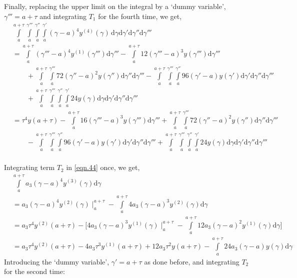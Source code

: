 \documentclass{article}
\begin{document}
Finally, replacing the upper limit on the integral by a \lq dummy variable\rq, $\gamma'''=a+\tau$ and integrating $T_1$ for the fourth time, we get,\\
\begin{equation}\label{eqn.49}
\begin{split}
&\int\limits_{a}^{a+\tau}\int\limits_{a}^{\gamma'''}\int\limits_{a}^{\gamma''}\int\limits_{a}^{\gamma'} (\gamma-a)^4 y^{(4)}(\gamma)\, \mathrm{d}\gamma \mathrm{d}\gamma'\mathrm{d}\gamma''\mathrm{d}\gamma'''\\ 
& = \int\limits_{a}^{a+\tau}(\gamma'''-a)^{4}y^{(1)}(\gamma''')\mathrm{d}\gamma''' -\int\limits_{a}^{a+\tau} 12(\gamma'''-a)^{3}y(\gamma''')\mathrm{d}\gamma'''\\&\qquad{} + \int\limits_{a}^{a+\tau}\int\limits_{a}^{\gamma'''}72(\gamma''-a)^{2}y(\gamma'')\mathrm{d}\gamma''\mathrm{d}\gamma'''- \int\limits_{a}^{a+\tau}\int\limits_{a}^{\gamma'''}\int\limits_{a}^{\gamma''}96(\gamma'-a)y(\gamma')\mathrm{d}\gamma'\mathrm{d}\gamma''\mathrm{d}\gamma'''
\\&\qquad{}+ \int\limits_{a}^{a+\tau}\int\limits_{a}^{\gamma'''}\int\limits_{a}^{\gamma''}\int\limits_{a}^{\gamma'} 24 y(\gamma)\mathrm{d}\gamma\mathrm{d}\gamma'\mathrm{d}\gamma''\mathrm{d}\gamma'''\\
&= \tau^{4}y(a+\tau)-\int\limits_{a}^{a+\tau}16(\gamma'''-a)^{3}y(\gamma''')\mathrm{d}\gamma'''+\int\limits_{a}^{a+\tau}\int\limits_{a}^{\gamma'''}72(\gamma''-a)^{2}y(\gamma'')\mathrm{d}\gamma''\mathrm{d}\gamma'''\\
&\qquad{} - \int\limits_{a}^{a+\tau}\int\limits_{a}^{\gamma'''}\int\limits_{a}^{\gamma''}96(\gamma'-a)y(\gamma')\mathrm{d}\gamma'\mathrm{d}\gamma''\mathrm{d}\gamma''' +
\int\limits_{a}^{a+\tau}\int\limits_{a}^{\gamma'''}\int\limits_{a}^{\gamma''}\int\limits_{a}^{\gamma'}24y(\gamma)\mathrm{d}\gamma\mathrm{d}\gamma'\mathrm{d}\gamma''\mathrm{d}\gamma'''
\end{split}
\end{equation}
\\Integrating term $T_2$ in \eqref{eqn.44} once, we get,
\begin{equation}
\begin{split}
	&\int\limits_{a}^{a+\tau}a_3(\gamma -a)^{4}y^{(3)}(\gamma)\mathrm{d}\gamma\\
	& = a_3(\gamma-a)^{4}y^{(2)}(\gamma)\mid_{a}^{a+\tau} - \int\limits_{a}^{a+\tau}4a_3(\gamma -a)^{3}y^{(2)}(\gamma)\mathrm{d}\gamma\\
	& = a_3\tau^{4}y^{(2)}(a+\tau) - \bigg[4a_3(\gamma-a)^{3}y^{(1)}(\gamma)\mid_{a}^{a+\tau}- \int\limits_{a}^{a+\tau}12a_3(\gamma-a)^{2}y^{(1)}(\gamma)\mathrm{d}\gamma\bigg]\\
	& = a_3\tau^{4}y^{(2)}(a+\tau) -4a_3\tau^{3}y^{(1)}(a+\tau) + 12a_3\tau^{2}y(a+\tau)-\int\limits_{a}^{a+\tau}24a_3(\gamma-a)y(\gamma)\mathrm{d}\gamma
	\end{split}
\end{equation}
Introducing the \lq dummy variable\rq, $\gamma'=a+\tau$ as done before, and integrating $T_2$ for the second time:
\end{document}
